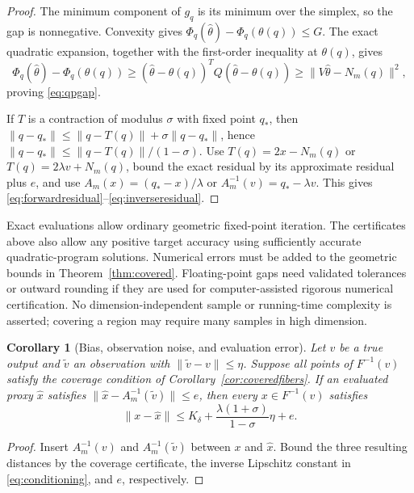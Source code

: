 \documentclass[11pt]{article}
\numberwithin{equation}{section}
\newtheorem{corollary}[theorem]{Corollary}
\theoremstyle{definition}
\theoremstyle{remark}
\newcommand{\norm}[1]{\lVert #1\rVert}
\begin{document}
\begin{proof}
The minimum component of $g_q$ is its minimum over the simplex, so the
gap is nonnegative. Convexity gives
$\Phi_q(\widehat\theta)-\Phi_q(\theta(q))\le G$. The exact quadratic
expansion, together with the first-order inequality at $\theta(q)$,
gives
\[
 \Phi_q(\widehat\theta)-\Phi_q(\theta(q))
 \ge(\widehat\theta-\theta(q))^TQ(\widehat\theta-\theta(q))
 \ge\norm{V\widehat\theta-N_m(q)}^2,
\]
proving \eqref{eq:qpgap}.

If $T$ is a contraction of modulus $\sigma$ with fixed point $q_*$,
then
$\norm{q-q_*}\le\norm{q-T(q)}+\sigma\norm{q-q_*}$, hence
$\norm{q-q_*}\le\norm{q-T(q)}/(1-\sigma)$.
Use $T(q)=2x-N_m(q)$ or $T(q)=2\lambda v+N_m(q)$, bound the exact
residual by its approximate residual plus $e$, and use
$A_m(x)=(q_*-x)/\lambda$ or $A_m^{-1}(v)=q_*-\lambda v$.
This gives \eqref{eq:forwardresidual}--\eqref{eq:inverseresidual}.
\end{proof}

Exact evaluations allow ordinary geometric fixed-point iteration. The
certificates above also allow any positive target accuracy using
sufficiently accurate quadratic-program solutions. Numerical errors
must be added to the geometric bounds in Theorem~\ref{thm:covered}.
Floating-point gaps need validated tolerances or outward rounding if
they are used for computer-assisted rigorous numerical certification.
No dimension-independent sample or running-time complexity is asserted;
covering a region may require many samples in high dimension.

\begin{corollary}[Bias, observation noise, and evaluation error]
\label{cor:totalerror}
Let $v$ be a true output and $\widetilde v$ an observation with
$\norm{\widetilde v-v}\le\eta$. Suppose all points of
$F^{-1}(v)$ satisfy the coverage condition of
Corollary~\ref{cor:coveredfibers}. If an evaluated proxy
$\widehat x$ satisfies
$\norm{\widehat x-A_m^{-1}(\widetilde v)}\le e$, then every
$x\in F^{-1}(v)$ satisfies
\begin{equation}\label{eq:totalerror}
 \norm{x-\widehat x}
 \le K_\delta+
       \frac{\lambda(1+\sigma)}{1-\sigma}\eta+e.
\end{equation}
\end{corollary}
\begin{proof}
Insert $A_m^{-1}(v)$ and $A_m^{-1}(\widetilde v)$ between $x$ and
$\widehat x$. Bound the three resulting distances by the coverage
certificate, the inverse Lipschitz constant in
\eqref{eq:conditioning}, and $e$, respectively.
\end{proof}
\end{document}
